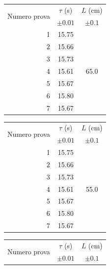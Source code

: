 \documentclass{article}
\begin{document}
\begin{table}[h!]
	\hspace{-0.05\textwidth}
	\begin{minipage}{0.1\textwidth}
			\begin{tabular}{ | r | c | c | }
    				\hline
    				\multirow{2}{5em}{Numero prova} & $\tau$ (s) & $L$ (cm) \\
    				& $\pm 0.01$ & $\pm 0.1$ \\
    				\hline
    				1 & 15.75 & \multirow{7}{*}{65.0} \\ \cline{1-2}
    				2 & 15.66 & \\ \cline{1-2}
    				3 & 15.73 & \\ \cline{1-2}
    				4 & 15.61 & \\ \cline{1-2}
    				5 & 15.67 & \\ \cline{1-2}
    				6 & 15.80 & \\ \cline{1-2}
    				7 & 15.67 & \\ \cline{1-2}
    				\hline
			\end{tabular}
	\end{minipage}
	\hspace{0.3\textwidth}
	\begin{minipage}{0.1\textwidth}
			\begin{tabular}{ | r | c | c | }
    				\hline
    				\multirow{2}{5em}{Numero prova} & $\tau$ (s) & $L$ (cm) \\
    				& $\pm 0.01$ & $\pm 0.1$ \\
    				\hline
    				1 & 15.75 & \multirow{7}{*}{55.0} \\ \cline{1-2}
    				2 & 15.66 & \\ \cline{1-2}
    				3 & 15.73 & \\ \cline{1-2}
    				4 & 15.61 & \\ \cline{1-2}
    				5 & 15.67 & \\ \cline{1-2}
    				6 & 15.80 & \\ \cline{1-2}
    				7 & 15.67 & \\ \cline{1-2}
    				\hline
			\end{tabular}
	\end{minipage}
	\hspace{0.3\textwidth}
	\begin{minipage}{0.1\textwidth}
			\begin{tabular}{ | r | c | c | }
    				\hline
    				\multirow{2}{5em}{Numero prova} & $\tau$ (s) & $L$ (cm) \\
    				& $\pm 0.01$ & $\pm 0.1$ \\

\end{tabular}
\end{minipage}
\end{table}
\end{document}
